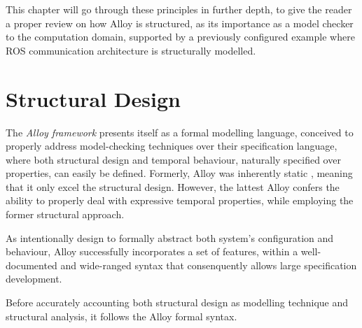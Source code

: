 This chapter will go through these principles in further depth, to give the reader a proper review on how Alloy is structured, as its importance as a model checker to the computation domain, supported by a previously configured example where ROS communication architecture is structurally modelled.

\section{Structural Design}

The \textit{Alloy framework} presents itself as a formal modelling language, conceived to properly address model-checking techniques over their specification language, where both structural design and temporal behaviour, naturally specified over properties, can easily be defined. Formerly, Alloy was inherently static \cite{lwspecification}, meaning that it only excel the structural design. However, the lattest Alloy confers the ability to properly deal with expressive temporal properties, while employing the former structural approach. 

As intentionally design to formally abstract both system's configuration and behaviour, Alloy successfully incorporates a set of features, within a well-documented and wide-ranged syntax that consenquently allows large specification development. \cite{carvalho2020analysis} 

Before accurately accounting both structural design as modelling technique and structural analysis, it follows the Alloy formal syntax.

